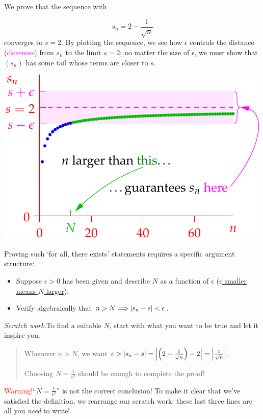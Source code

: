 \begin{example}{}{}
	We prove that the sequence with\par
	\begin{minipage}[t]{0.5\linewidth}\vspace{0pt}
	\[
		s_n=2-\frac 1{\sqrt n}
	\]
	converges to $s=2$.\medbreak
	By plotting the sequence, we see how $\epsilon$ controls the distance (\textcolor{Magenta}{closeness}) from $s_n$ to the limit $s=2$; no matter the size of $\epsilon$, we must show that $(s_n)$ has some \textcolor{Green}{tail} whose terms are closer to $s$.
	\end{minipage}
	\hfill
	\begin{minipage}[t]{0.49\linewidth}\vspace{-20pt}
		\flushright\includegraphics[scale=0.95]{limitdef-pic}
	\end{minipage}\medbreak
	
	Proving such `for all, there exists' statements requires a specific argument structure:
	\begin{itemize}\itemsep0pt
	  \item Suppose $\epsilon>0$ has been given and describe $N$ as a function of $\epsilon$ (\href{http://www.math.uci.edu/~ndonalds/math140a/limitdefanim.html}{$\epsilon$ smaller means $N$ larger}).
	  \item Verify algebraically that $n>N\Longrightarrow\left| s_n-s\right|<\epsilon$.
	\end{itemize}
	
	\emph{Scratch work.}\quad To find a suitable $N$, start with what you want to be true and let it inspire you.
	\begin{quote}
		Whenever $n>N$, we want $\epsilon>\left| s_n-s\right|=\left| \left(2-\frac 1{\sqrt n}\right)-2\right| =\left| \frac 1{\sqrt n}\right|$.\par
		Choosing $N=\frac 1{\epsilon^2}$ should be enough to complete the proof!
	\end{quote}
	\textcolor{red}{Warning!}\quad ``$N=\frac 1{\epsilon^2}$'' is not the correct conclusion! To make it clear that we've satisfied the definition, we rearrange our scratch work: these last three lines are all you \emph{need} to write!\medbreak
	

\end{example}
